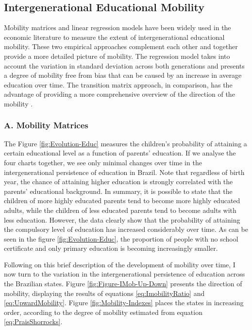 \documentclass[a4paper, 12pt]{article}
\begin{document}
\subsection{Intergenerational Educational Mobility} \label{Mobility}

Mobility matrices and linear regression models have been widely used in the economic literature to measure the extent of intergenerational educational mobility. These two empirical approaches complement each other and together provide a more detailed picture of mobility. The regression model takes into account the variation in standard deviation across both generations and presents a degree of mobility free from bias that can be caused by an increase in average education over time. The transition matrix approach, in comparison, has the advantage of providing a more comprehensive overview of the direction of the mobility \citep{corak1999intergenerational, Fields2002}.


\subsubsection*{A. Mobility Matrices}

The Figure \ref{fig:Evolution-Educ} measures the children’s probability of attaining a certain educational level as a function of parents’ education. If we analyse the four charts together, we see only minimal changes over time in the intergenerational persistence of education in Brazil. Note that regardless of birth year, the chance of attaining higher education is strongly correlated with the parents’ educational background. In summary, it is possible to state that the children of more highly educated parents tend to become more highly educated adults, while the children of less educated parents tend to become adults with less education. However, the data clearly show that the probability of attaining the compulsory level of education has increased considerably over time. As can be seen in the figure \ref{fig:Evolution-Educ}, the proportion of people with no school certificate and only primary education is becoming increasingly smaller.

Following on this brief description of the development of mobility over time, I now turn to the variation in the intergenerational persistence of education across the Brazilian states. Figure \ref{fig:Figure-IMob-Up-Down} presents the direction of mobility, displaying the results of equations \eqref{eq:ImobilityRatio} and \eqref{eq:UpwardMobility}. Figure \ref{fig:Mobility-Indexes} places the states in increasing order, according to the degree of mobility estimated from equation \eqref{eq:PraisShorrocks}.
\end{document}
